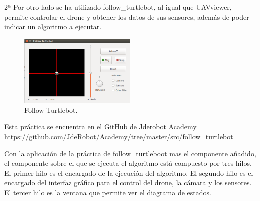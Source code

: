 \item 2ª Por otro lado se ha utilizado follow\_turtlebot, al igual que UAVviewer, permite controlar el drone y obtener los datos de sus sensores, adem\'as de poder indicar un algoritmo a ejecutar.
 \begin{figure}[H]
	\centering
		\includegraphics[width=0.5\textwidth]{imgs/follow_turtlebot.png}
		\caption{Follow Turtlebot.}
	\label{fig:FollowTurtlebot}
\end{figure}

\hspace{1 cm}Esta pr\'actica se encuentra en el GitHub de Jderobot Academy \url{https://github.com/JdeRobot/Academy/tree/master/src/follow_turtlebot}

\hspace{1 cm}Con la aplicaci\'on de la pr\'actica de follow\_turtleboot mas el componente añadido, el componente sobre el que se ejecuta el algoritmo est\'a compuesto por tres hilos. El primer hilo es el encargado de la ejecuci\'on del algoritmo. El segundo hilo es el encargado del interfaz gr\'afico para el control del drone, la c\'amara y los sensores. El tercer hilo es la ventana que permite ver el diagrama de estados. 





